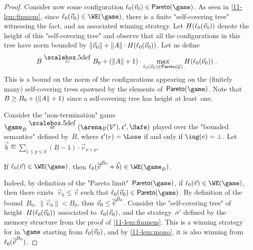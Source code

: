 \begin{proof}

  Consider now some configuration $\loc_0(\vec
  v_0)\in\mathsf{Pareto}(\game)$.  As seen in \cref{11-lem:finmem},
  since $\loc_0(\vec v_0)\in\WE(\game)$, there is a finite
  "self-covering tree" witnessing the fact, and an associated winning
  strategy.  Let $H(\loc_0(\vec v_0))$ denote the height of this
  "self-covering tree" and observe that all the configurations in this
  tree have norm bounded by $\|\vec v_0\|+\|\Act\|\cdot H(\loc_0(\vec
  v_0))$.
  Let us define
  \begin{equation}\label{11-eq:b}
   B\eqdef B_0+(\|\Act\|+1)\cdot \max_{\loc_0(\vec
  v_0)\in\mathsf{Pareto}(\?G)}H(\loc_0(\vec v_0))\;.
  \end{equation}
  This is a bound on the norm of the configurations appearing on the
  (finitely many) self-covering trees spawned by the elements
  of~$\mathsf{Pareto}(\game)$.  Note that $B\geq B_0+(\|\Act\|+1)$ since
  a self-covering tree has height at least~one.

  Consider the "non-termination" game
  $\game_B\eqdef(\bounded(\?V'),\col',\Safe)$ played over the
  "bounded semantics" defined by~$B$, where $\col'(e)=\Lose$ if and
  only if $\ing(e)=\sink$.  Let $\vec b\eqdef\sum_{1\leq p\leq
  d}(B-1)\cdot\vec e_{\dd+p}$.
  {\renewcommand{\qedsymbol}{}
  \begin{claim}\label{11-cl:parity2bounding} If $\loc_0(\vec
    v)\in\WE(\game)$, then
    $\loc_0(\capp[B_0]{v}+\vec b)\in\WE(\game_B)$.
  \end{claim}}
  Indeed, by definition of the "Pareto
  limit"~$\mathsf{Pareto}(\game)$, if $\loc_0(\vec v)\in\WE(\game)$,
  then there exists~$\vec v_0\leq\vec v$ such that $\loc_0(\vec
  v_0)\in\mathsf{Pareto}(\game)$.  By definition of the bound~$B_0$,
  $\|\vec v_0\|<B_0$, thus $\vec v_0\leq\capp[B_0]v$.  Consider the
  "self-covering tree" of height~$H(\loc_0(\vec v_0))$ associated
  to~$\loc_0(\vec v_0)$, and the strategy~$\sigma'$ defined by the
  memory structure from the
  proof of \cref{11-lem:finmem}.  This is a winning strategy for \Eve
  in $\game$ starting from $\loc_0(\vec v_0)$, and
  by \cref{11-lem:mono}, it is also winning
  from~$\loc_0(\capp[B_0]v)$.
    

\end{proof}

